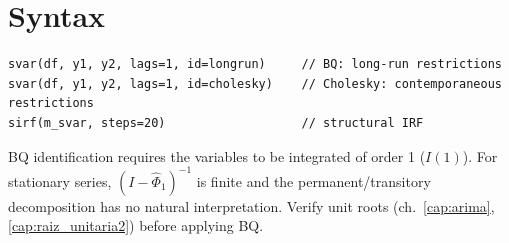\section{Syntax}

\begin{lstlisting}
svar(df, y1, y2, lags=1, id=longrun)     // BQ: long-run restrictions
svar(df, y1, y2, lags=1, id=cholesky)    // Cholesky: contemporaneous restrictions
sirf(m_svar, steps=20)                   // structural IRF
\end{lstlisting}

\begin{nota}
  BQ identification requires the variables to be integrated of order 1
  ($I(1)$). For stationary series, $(I - \hat{\Phi}_1)^{-1}$ is finite and
  the permanent/transitory decomposition has no natural interpretation.
  Verify unit roots (ch.~\ref{cap:arima}, \ref{cap:raiz_unitaria2})
  before applying BQ.
\end{nota}
